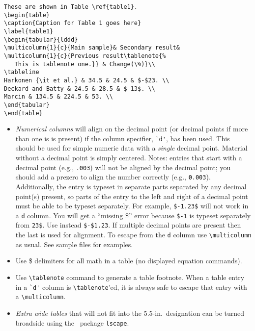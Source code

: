 \se\begin{verbatim}
These are shown in Table \ref{table1}.
\begin{table}
\caption{Caption for Table 1 goes here}
\label{table1}
\begin{tabular}{lddd}
\multicolumn{1}{c}{Main sample}& Secondary result&
\multicolumn{1}{c}{Previous result\tablenote{%
   This is tablenote one.}} & Change(\%)}\\
\tableline
Harkonen {\it et al.} & 34.5 & 24.5 & $-$23. \\
Deckard and Batty & 24.5 & 28.5 & $-13$. \\
Marcin & 134.5 & 224.5 & 53. \\
\end{tabular}
\end{table}
\end{verbatim}
\ee
\noindent
\begin{itemize}
 
\item {\em Numerical columns\/} will align on the decimal point (or
decimal points if more than one is is present) if the column specifier,
\verb+`d'+, has been used. This should be used for simple numeric data with a
{\em single\/} decimal point. Material without a decimal point is simply
centered. Notes: entries that start with a decimal point (e.g.,
\verb+.003+) will not be aligned by the decimal point; you should add a
prezero to align the number correctly (e.g., \verb+0.003+). Additionally,
the entry is typeset in separate parts separated by any decimal point(s)
present, so parts of the entry to the left and right of a decimal point
must be able to be typeset separately. For example, \verb+$-1.23$+ will not
work in a \verb+d+ column. You will get a ``missing \$'' error because
\verb+$-1+ is typeset separately from \verb+23$+. Use instead
\verb+$-$1.23+. If multiple decimal points are present then the last is
used for alignment. To escape from the \verb+d+ column use
\verb+\multicolumn+ as usual. See sample files for examples.
 
\item Use \$ delimiters for all math in a table (no displayed equation
commands).
 
\item Use \verb+\tablenote+ command to generate a table footnote. When a
table entry in a \verb+`d'+ column is \verb+\tablenote+'ed, it is always
safe to escape that entry with a \verb+\multicolumn+.
 
\item {\em Extra wide tables\/}
that will not fit into the 5.5-in.\ designation can be turned  broadside
using the \latexe\ package \verb+lscape+.
 
\end{itemize}
 
